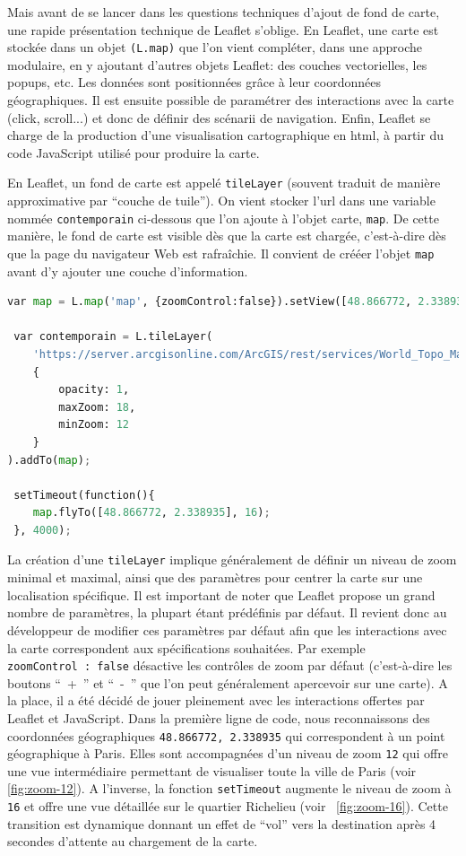 Mais avant de se lancer dans les questions techniques d'ajout de fond de carte, une rapide présentation technique de Leaflet s'oblige. En Leaflet, une carte est stockée dans un objet \texttt{(L.map)} que l'on vient compléter, dans une approche modulaire, en y ajoutant d'autres objets Leaflet: des couches vectorielles, les popups, etc. Les données sont positionnées grâce à leur coordonnées géographiques. Il est ensuite possible de paramétrer des interactions avec la carte (click, scroll...) et donc de définir des scénarii de navigation. Enfin, Leaflet se charge de la production d'une visualisation cartographique en \acrshort{html}, à partir du code JavaScript utilisé pour produire la carte.

En Leaflet, un fond de carte est appelé \texttt{tileLayer} (souvent traduit de manière approximative par \enquote{couche de tuile}). On vient stocker l'\acrshort{url} dans une variable nommée \texttt{contemporain} ci-dessous que l'on ajoute à l'objet carte, \texttt{map}. De cette manière, le fond de carte est visible dès que la carte est chargée, c'est-à-dire dès que la page du navigateur Web est rafraîchie. Il convient de crééer l'objet \texttt{map} avant d'y ajouter une couche d'information.
 \begin{lstlisting}[language=PYTHON, caption=Variables et fonction d'initialisation de la carte en JavaScript]
 var map = L.map('map', {zoomControl:false}).setView([48.866772, 2.338935], 12);    
 
 var contemporain = L.tileLayer(
    'https://server.arcgisonline.com/ArcGIS/rest/services/World_Topo_Map/MapServer/tile/{z}/{y}/{x}', 
    {
        opacity: 1, 
        maxZoom: 18,
        minZoom: 12
    }
).addTo(map); 

 setTimeout(function(){
    map.flyTo([48.866772, 2.338935], 16);
 }, 4000);\end{lstlisting}
 
La création d'une \texttt{tileLayer} implique généralement de définir un niveau de zoom minimal et maximal, ainsi que des paramètres pour centrer la carte sur une localisation spécifique. 
Il est important de noter que Leaflet propose un grand nombre de paramètres, la plupart étant prédéfinis par défaut. Il revient donc au développeur de modifier ces paramètres par défaut afin que les interactions avec la carte correspondent aux spécifications souhaitées. Par exemple \texttt{zoomControl~:~false} désactive les contrôles de zoom par défaut (c'est-à-dire les boutons \enquote{~+~} et \enquote{~-~} que l'on peut généralement apercevoir sur une carte). A la place, il a été décidé de jouer pleinement avec les interactions offertes par Leaflet et JavaScript. 
Dans la première ligne de code, nous reconnaissons des coordonnées géographiques \texttt{48.866772, 2.338935} qui correspondent à un point géographique à Paris. Elles sont accompagnées d'un niveau de zoom \texttt{12} qui offre une vue intermédiaire permettant de visualiser toute la ville de Paris (voir~ \ref{fig:zoom-12}). A l'inverse, la fonction \texttt{setTimeout} augmente le niveau de zoom à \texttt{16} et offre une vue détaillée sur le quartier Richelieu (voir~ \ref{fig:zoom-16}). Cette transition est dynamique donnant un effet de \enquote{vol} vers la destination après 4 secondes d'attente au chargement de la carte.

